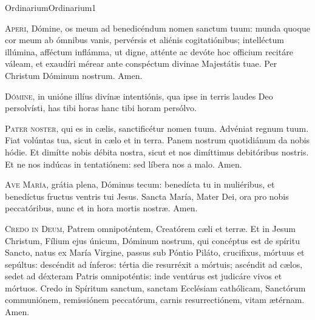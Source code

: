 \documentclass[nocturnale-romanum.tex]{subfiles}
\begin{document}
	{Ordinarium}{Ordinarium}{1}{}{}{}{}{}{}


\begin{multicols}{2}
\lettrine{A}{peri}, Dómine, os meum ad benedicéndum nomen sanctum tuum:
munda quoque cor meum ab ómnibus vanis, pervérsis et aliénis cogitatiónibus; 
intelléctum illúmina, afféctum inflámma, ut digne, atténte ac devóte
hoc officium recitáre váleam, et exaudíri mérear
ante conspéctum divinae Majestátis tuae. Per Christum Dóminum nostrum. Amen.

\lettrine{D}{ómine}, in unióne illíus divínæ intentiónis,
qua ipse in terris laudes Deo persolvísti,
has tibi horas  hanc tibi horam\rubric{)} persólvo.
\end{multicols}


\begin{multicols}{2}
\lettrine{P}{ater noster}, qui es in cælis, sanctificétur nomen tuum.
Advéniat regnum tuum. Fiat volúntas tua, sicut in cælo et in terra.
Panem nostrum quotidiánum da nobis hódie.
Et dimítte nobis débita nostra, sicut et nos dimíttimus debitóribus nostris.
Et ne nos indúcas in tentatiónem: sed líbera nos a malo. Amen.

\lettrine{A}{ve María}, grátia plena, Dóminus tecum:
benedícta tu in muliéribus, et benedíctus fructus ventris tui Jesus.
Sancta María, Mater Dei, ora pro nobis peccatóribus,
nunc et in hora mortis nostræ. Amen.

\lettrine{C}{redo in Deum}, Patrem omnipoténtem, Creatórem cæli et terræ.
Et in Jesum Christum, Fílium ejus únicum, Dóminum nostrum,
qui concéptus est de spíritu Sancto, natus ex María Virgine,
passus sub Póntio Piláto, crucifixus, mórtuus et sepúltus:
descéndit ad ínferos: tértia die resurréxit a mórtuis;
ascéndit ad cælos, sedet ad déxteram Patris omnipoténtis:
inde ventúrus est judicáre vivos et mórtuos.
Credo in Spíritum sanctum, sanctam Ecclésiam cathólicam,
Sanctórum communiónem, remissiónem peccatórum,
carnis resurrectiónem, vitam ætérnam. Amen.
\end{multicols}
\end{document}
